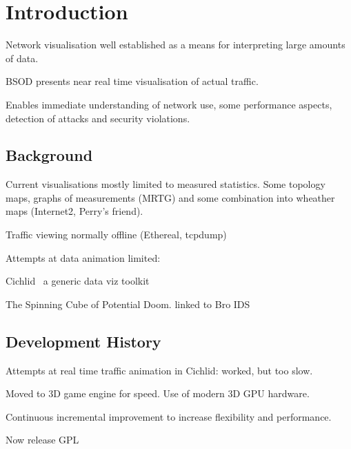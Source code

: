 \section{Introduction}
\label{intro}


Network visualisation well established as a means for interpreting large amounts of data.

BSOD presents near real time visualisation of actual traffic.

Enables immediate understanding of network use, some performance aspects, detection of attacks and security violations.

\subsection{Background}

Current visualisations mostly limited to measured statistics.  Some topology maps, graphs of measurements (MRTG) and some combination into wheather maps (Internet2, Perry's friend).

Traffic viewing normally offline (Ethereal, tcpdump)

Attempts at data animation limited:

Cichlid~\cite{web:cichlid} a generic data viz toolkit

The Spinning Cube of Potential Doom.  linked to Bro IDS

\subsection{Development History}

Attempts at real time traffic animation in Cichlid: worked, but too slow.

Moved to 3D game engine for speed.  Use of modern 3D GPU hardware.

Continuous incremental improvement to increase flexibility and performance.

Now release GPL
